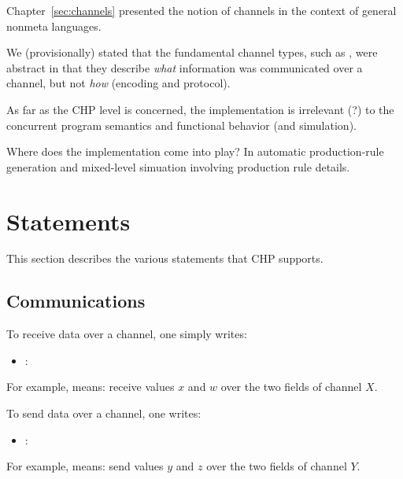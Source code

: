Chapter~\ref{sec:channels} presented the notion of channels
in the context of general nonmeta languages.  

We (provisionally) stated that the fundamental channel types, 
such as , were abstract in that they describe
\emph{what} information was communicated over a channel, 
but not \emph{how} (encoding and protocol).  

As far as the CHP level is concerned, 
the implementation is irrelevant (?) to the 
concurrent program semantics and functional behavior (and simulation).  

Where does the implementation come into play?
In automatic production-rule generation and mixed-level simuation
involving production rule details.  

\section{Statements}
\label{sec:chp:stmts}

This section describes the various statements that CHP supports.  

\subsection{Communications}
\label{sec:chp:stmts:comm}

To receive data over a channel, one simply writes: 

\begin{itemize}
\item {} :  \query
	\ttt{(}  \ttt{)}
\end{itemize}

\noindent
For example,  means: receive values $x$ and $w$ over
the two fields of channel $X$.  

To send data over a channel, one writes:

\begin{itemize}
\item {} :  \bang
	\ttt{(}  \ttt{)}
\end{itemize}

\noindent
For example,  means: send values $y$ and $z$ over
the two fields of channel $Y$.  

